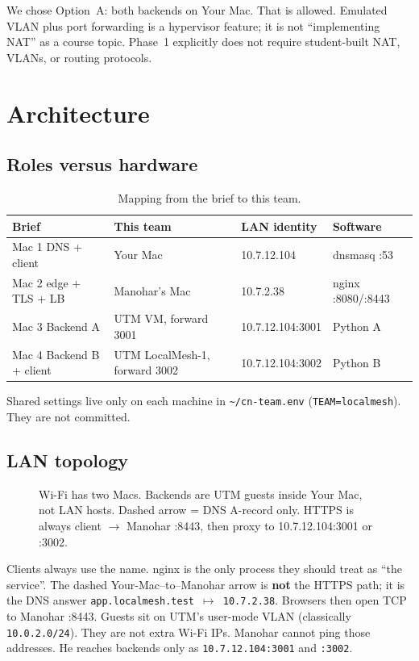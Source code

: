 \documentclass[11pt,a4paper]{article}
\begin{document}
We chose Option~A: both backends on Your Mac. That is allowed. Emulated VLAN plus port
forwarding is a hypervisor feature; it is not ``implementing NAT'' as a course topic.
Phase~1 explicitly does not require student-built NAT, VLANs, or routing protocols.

\section{Architecture}

\subsection{Roles versus hardware}
\begin{table}[h]
\centering
\caption{Mapping from the brief to this team.}
{\small
\begin{tabular}{@{}llll@{}}
\toprule
\textbf{Brief} & \textbf{This team} & \textbf{LAN identity} & \textbf{Software} \\
\midrule
Mac 1 DNS + client & Your Mac & 10.7.12.104 & dnsmasq :53 \\
Mac 2 edge + TLS + LB & Manohar's Mac & 10.7.2.38 & nginx :8080/:8443 \\
Mac 3 Backend A & UTM VM, forward 3001 & 10.7.12.104:3001 & Python A \\
Mac 4 Backend B + client & UTM LocalMesh-1, forward 3002 & 10.7.12.104:3002 & Python B \\
\bottomrule
\end{tabular}}
\end{table}

Shared settings live only on each machine in \texttt{\textasciitilde/cn-team.env}
(\texttt{TEAM=localmesh}). They are not committed.

\subsection{LAN topology}
\begin{figure}[H]
\centering
\resizebox{\textwidth}{!}{\drawTopology}
\caption{Wi-Fi has two Macs. Backends are UTM guests inside Your Mac, not LAN hosts. Dashed arrow = DNS A-record only. HTTPS is always client $\to$ Manohar :8443, then proxy to 10.7.12.104:3001 or :3002.}
\end{figure}

Clients always use the name. nginx is the only process they should treat as ``the service''.
The dashed Your-Mac--to--Manohar arrow is \textbf{not} the HTTPS path; it is the DNS answer
\texttt{app.localmesh.test $\mapsto$ 10.7.2.38}. Browsers then open TCP to Manohar :8443.
Guests sit on UTM's user-mode VLAN (classically \texttt{10.0.2.0/24}). They are not extra
Wi-Fi IPs. Manohar cannot ping those addresses. He reaches backends only as
\texttt{10.7.12.104:3001} and \texttt{:3002}.
\end{document}
